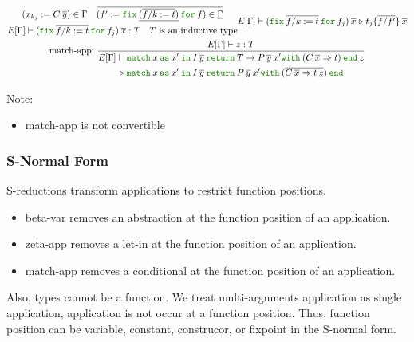 \documentclass[a4paper,fleqn]{article}
\newcommand{\kwin}{\mbox{\color{mygreen}\ttfamily in}}
\newcommand{\kwmatch}{\mbox{\color{mygreen}\ttfamily match}}
\newcommand{\kwas}{\mbox{\color{mygreen}\ttfamily as}}
\newcommand{\kwreturn}{\mbox{\color{mygreen}\ttfamily return}}
\newcommand{\kwwith}{\mbox{\color{mygreen}\ttfamily with}}
\newcommand{\kwend}{\mbox{\color{mygreen}\ttfamily end}}
\newcommand{\kwfix}{\mbox{\color{mygreen}\ttfamily fix}}
\newcommand{\kwfor}{\mbox{\color{mygreen}\ttfamily for}}
\newcommand{\ofix}[2]{\kwfix\:{#1}\:\kwfor\:{#2}}
\newcommand{\substm}[3]{#1\{\overline{#2/#3}\}}
\newcommand{\reltri}{\mathrel{\triangleright}}
\begin{document}
\begin{gather*}
    {
      \begin{gathered}
        (x_{k_j} := C\:\overline{y}) \in \Gamma \quad
        \overline{(f' := \ofix{\underline{(\overline{f/k:=t})}}{f}) \in \underline{\Gamma}} \\
        E[\Gamma] \vdash (\ofix{\overline{f/k:=t}}{f_j})\:\overline{x} : T \quad
        \text{$T$ is an inductive type}
      \end{gathered}
    }{
      E[\Gamma] \vdash
      (\ofix{\overline{f/k:=t}}{f_j})\:\overline{x}
      \reltri
      \substm{t_j}{f}{f'} \:\overline{x}
    } \\
  \text{match-app:}~
    \dfrac
    {
      E[\Gamma] \vdash z : T
    }{
      \begin{aligned}
        E[\Gamma] \vdash\; &
          \kwmatch\:x\:
          \kwas\:x'\:
          \kwin\:I\:\overline{y}\:
          \kwreturn\:{T \rightarrow P\:\overline{y}\:x'}
          \kwwith\:(\overline{{C\: \overline{x}} \Rightarrow {t}})\:
          \kwend\:z \\
        \reltri\; &
          \kwmatch\:x\:
          \kwas\:x'\:
          \kwin\:I\:\overline{y}\:
          \kwreturn\:{P\:\overline{y}\:x'}
          \kwwith\:(\overline{{C\: \overline{x}} \Rightarrow {t\:\underline{z}}})\:
          \kwend
      \end{aligned}
    }
\end{gather*}

{\small Note:
\begin{itemize}
  \item match-app is not convertible
\end{itemize}}

\subsubsection{S-Normal Form}\label{sec:s-normal-form}
S-reductions transform applications to restrict function positions.
\begin{itemize}
  \item beta-var removes an abstraction at the function position of an application.
  \item zeta-app removes a let-in at the function position of an application.
  \item match-app removes a conditional at the function position of an application.
\end{itemize}
Also, types cannot be a function.
We treat multi-arguments application as single application, application is not occur at a function position.
Thus, function position can be variable, constant, construcor, or fixpoint in the S-normal form.
\end{document}
